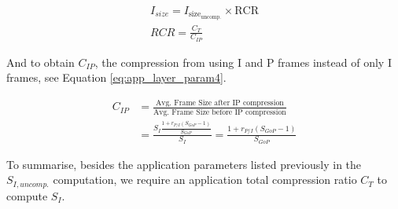 \begin{gather}
    I_{size} = I_{{\text{size}}_\text{uncomp.}} \times \text{RCR}  \label{eq:app_layer_param2} \\
    RCR = \frac{C_T}{C_{IP}} \label{eq:app_layer_param3} 
\end{gather}

And to obtain $C_{IP}$, the compression from using I and P frames instead of only I frames, see Equation \ref{eq:app_layer_param4}.

\begin{align}
    C_{IP} & = \frac{\text{Avg. Frame Size after IP compression}}{\text{Avg. Frame Size before IP compression}} \nonumber \\
    & = \frac{S_I \frac{1 + r_{P/I} (S_{GoP} - 1)}{S_{GoP}}}{S_I} = \frac{1 + r_{P/I} (S_{GoP} - 1)}{S_{GoP}}\label{eq:app_layer_param4} 
\end{align}

To summarise, besides the application parameters listed previously in the $S_{I, uncomp.}$ computation, we require an application total compression ratio $C_T$ to compute $S_I$.